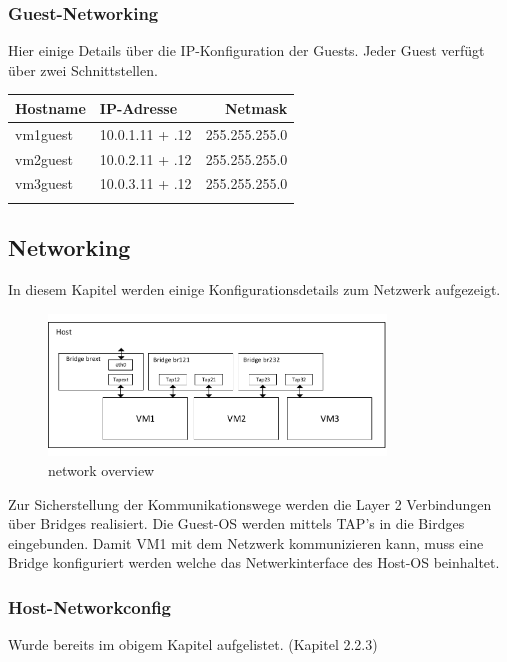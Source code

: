 \documentclass[a4,12pt]{scrartcl}
\begin{document}
\subsubsection{Guest-Networking}
Hier einige Details über die IP-Konfiguration der Guests. Jeder Guest verfügt über zwei Schnittstellen.  
\begin{center}
    \begin{tabular}{@{} l l r@{}}\toprule    
    {Hostname} & {IP-Adresse} & {Netmask}\\ \toprule
    vm1guest & 10.0.1.11 + .12 & 255.255.255.0\\ 
    vm2guest & 10.0.2.11 + .12 & 255.255.255.0\\
    vm3guest & 10.0.3.11 + .12 & 255.255.255.0\\ \addlinespace
    \bottomrule
    \end{tabular}
\end{center}

\subsection{Networking}
In diesem Kapitel werden einige Konfigurationsdetails zum Netzwerk aufgezeigt.
\begin{figure} [H]
	\begin{center}
	\includegraphics[width=0.80\textwidth]{./draws/uebersicht_bridges_taps_visio.pdf}
	\caption{{network overview}}
	\label{virtualdir}
	\end{center}
\end{figure}

\noindent Zur Sicherstellung der Kommunikationswege werden die Layer 2 Verbindungen über Bridges realisiert. Die Guest-OS werden mittels TAP's in die Birdges eingebunden. Damit VM1 mit dem Netzwerk kommunizieren kann, muss eine Bridge konfiguriert werden welche das Netwerkinterface  des Host-OS beinhaltet.

\subsubsection{Host-Networkconfig}
Wurde bereits im obigem Kapitel aufgelistet. (Kapitel 2.2.3)
 
\end{document}
